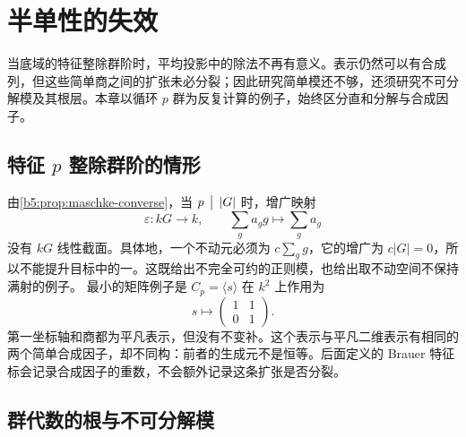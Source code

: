 ﻿%

\section{半单性的失效}
\label{b5:sec:0801}


%
%

当底域的特征整除群阶时，平均投影中的除法不再有意义。表示仍然可以有合成列，但这些简单商之间的扩张未必分裂；因此研究简单模还不够，还须研究不可分解模及其根层。本章以循环 \(p\) 群为反复计算的例子，始终区分直和分解与合成因子。

\subsection{\texorpdfstring{特征 \(p\) 整除群阶的情形}{特征 p 整除群阶的情形}}
\label{b5:subsec:0801:01}

由\cref{b5:prop:maschke-converse}，当 \(p\,\bigm\vert\,|G|\) 时，增广映射
\[
	\varepsilon:kG\longrightarrow k,\qquad \sum_g a_gg\longmapsto\sum_g a_g
\]
没有 \(kG\) 线性截面。具体地，一个不动元必须为 \(c\sum_g g\)，它的增广为 \(c|G|=0\)，所以不能提升目标中的一。这既给出不完全可约的正则模，也给出取不动空间不保持满射的例子。
\ProseParagraphBreak
最小的矩阵例子是 \(C_p=\langle s\rangle\) 在 \(k^2\) 上作用为
\[
	s\longmapsto\begin{pmatrix}1&1\\0&1\end{pmatrix}.
\]
第一坐标轴和商都为平凡表示，但没有不变补。这个表示与平凡二维表示有相同的两个简单合成因子，却不同构：前者的生成元不是恒等。后面定义的 Brauer 特征标会记录合成因子的重数，不会额外记录这条扩张是否分裂。

\subsection{群代数的根与不可分解模}
\label{b5:subsec:0801:02}

